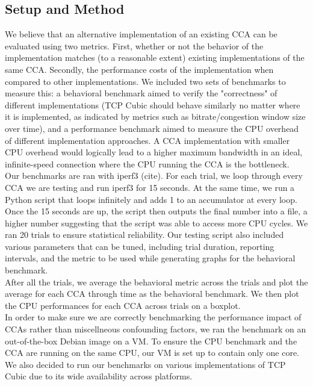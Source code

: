 \documentclass[../main.tex]{subfiles}
\begin{document}
\subsection{Setup and Method}
We believe that an alternative implementation of an existing CCA can be evaluated using two metrics. First, whether or not the behavior of the implementation matches (to a reasonable extent) existing implementations of the same CCA. Secondly, the performance costs of the implementation when compared to other implementations. We included two sets of benchmarks to measure this: a behavioral benchmark aimed to verify the "correctness" of different implementations (TCP Cubic should behave similarly no matter where it is implemented, as indicated by metrics such as bitrate/congestion window size over time), and a performance benchmark aimed to measure the CPU overhead of different implementation approaches. A CCA implementation with smaller CPU overhead would logically lead to a higher maximum bandwidth in an ideal, infinite-speed connection where the CPU running the CCA is the bottleneck. \\
Our benchmarks are ran with iperf3 (cite). For each trial, we loop through every CCA we are testing and run iperf3 for 15 seconds. At the same time, we run a Python script that loops infinitely and adds 1 to an accumulator at every loop. Once the 15 seconds are up, the script then outputs the final number into a file, a higher number suggesting that the script was able to access more CPU cycles. We ran 20 trials to ensure statistical reliability. Our testing script also included various parameters that can be tuned, including trial duration, reporting intervals, and the metric to be used while generating graphs for the behavioral benchmark. \\
After all the trials, we average the behavioral metric across the trials and plot the average for each CCA through time as the behavioral benchmark. We then plot the CPU performances for each CCA across trials on a boxplot. \\

In order to make sure we are correctly benchmarking the performance impact of CCAs rather than miscellneous confounding factors, we ran the benchmark on an out-of-the-box Debian image on a VM. To ensure the CPU benchmark and the CCA are running on the same CPU, our VM is set up to contain only one core. We also decided to run our benchmarks on various implementations of TCP Cubic due to its wide availability across platforms.
\end{document}
